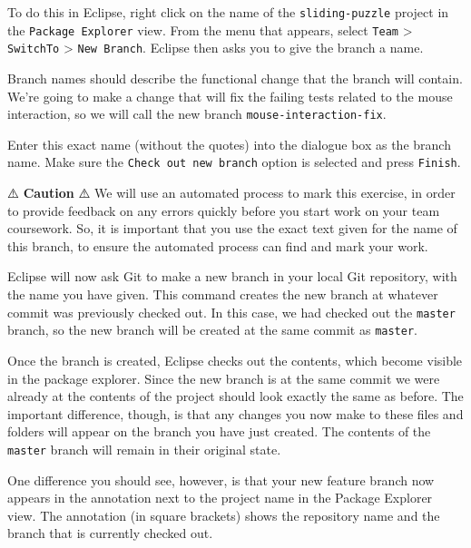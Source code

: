 \documentclass[
]{book}
\begin{document}
To do this in Eclipse, right click on the name of the \texttt{sliding-puzzle} project in the \texttt{Package\ Explorer} view. From the menu that appears, select \texttt{Team} \textgreater{} \texttt{SwitchTo} \textgreater{} \texttt{New\ Branch}. Eclipse then asks you to give the branch a name.

Branch names should describe the functional change that the branch will contain. We're going to make a change that will fix the failing tests related to the mouse interaction, so we will call the new branch \texttt{mouse-interaction-fix}.

Enter this exact name (without the quotes) into the dialogue box as the branch name. Make sure the \texttt{Check\ out\ new\ branch} option is selected and press \texttt{Finish}.

⚠️ \textbf{Caution} ⚠️
We will use an automated process to mark this exercise, in order to provide feedback on any errors quickly before you start work on your team coursework. So, it is important that you use the exact text given for the name of this branch, to ensure the automated process can find and mark your work.

Eclipse will now ask Git to make a new branch in your local Git repository, with the name you have given. This command creates the new branch at whatever commit was previously checked out. In this case, we had checked out the \texttt{master} branch, so the new branch will be created at the same commit as \texttt{master}.

Once the branch is created, Eclipse checks out the contents, which become visible in the package explorer. Since the new branch is at the same commit we were already at the contents of the project should look exactly the same as before. The important difference, though, is that any changes you now make to these files and folders will appear on the branch you have just created. The contents of the \texttt{master} branch will remain in their original state.

One difference you should see, however, is that your new feature branch now appears in the annotation next to the project name in the Package Explorer view. The annotation (in square brackets) shows the repository name and the branch that is currently checked out.
\end{document}
